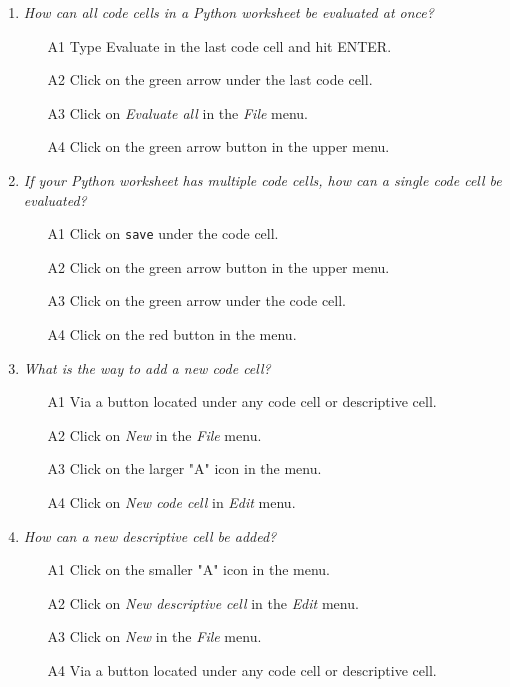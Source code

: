 \begin{enumerate}
\item {\em How can all code cells in a Python worksheet be evaluated at once?}\\

\begin{enumerate}
\item[A1] Type Evaluate in the last code cell and hit ENTER.
\item[A2] Click on the green arrow under the last code cell.
\item[A3] Click on {\em Evaluate all} in the {\em File} menu. 
\item[A4] Click on the green arrow button in the upper menu.
\end{enumerate}
\vspace{4mm}

\item {\em If your Python worksheet has multiple code cells, 
how can a single code cell be evaluated?}\\

\begin{enumerate}
\item[A1] Click on {\tt save} under the code cell.
\item[A2] Click on the green arrow button in the upper menu.
\item[A3] Click on the green arrow under the code cell.
\item[A4] Click on the red button in the menu.
\end{enumerate}
\vspace{4mm}

\item {\em What is the way to add a new code cell?}\\

\begin{enumerate}
\item[A1] Via a button located under any code cell or descriptive cell. 
\item[A2] Click on {\em New} in the {\em File} menu.
\item[A3] Click on the larger "A" icon in the menu.
\item[A4] Click on {\em New code cell} in {\em Edit} menu.
\end{enumerate}
\vspace{4mm}

\item {\em How can a new descriptive cell be added?}\\

\begin{enumerate}
\item[A1] Click on the smaller "A" icon in the menu.
\item[A2] Click on {\em New descriptive cell} in the {\em Edit} menu.
\item[A3] Click on {\em New} in the {\em File} menu.
\item[A4] Via a button located under any code cell or descriptive cell. 
\end{enumerate}
\vspace{4mm}


\end{enumerate}
